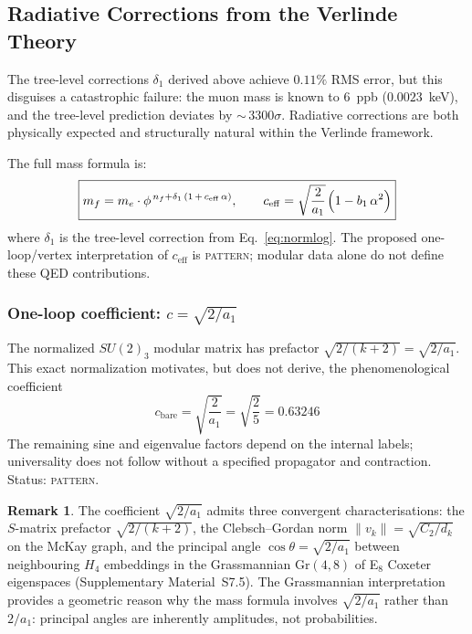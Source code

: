 \documentclass[12pt,a4paper]{article}
\theoremstyle{definition}
\newtheorem{remark}{Remark}
\begin{document}
\subsection{Radiative Corrections from the Verlinde Theory}
\label{sec:oneloop}

The tree-level corrections $\delta_1$ derived above achieve $0.11\%$ RMS error, but this disguises a catastrophic failure: the muon mass is known to $6$~ppb ($0.0023$~keV), and the tree-level prediction deviates by ${\sim}\,3300\sigma$.  Radiative corrections are both physically expected and structurally natural within the Verlinde framework.

The full mass formula is:
\begin{equation}
\boxed{m_f = m_e \cdot \phi^{\,n_f + \delta_1\,(1 \,+\, c_{\mathrm{eff}}\,\alpha)}, \qquad c_{\mathrm{eff}} = \sqrt{\frac{2}{a_1}}\;\!\Bigl(1 - b_1\,\alpha^2\Bigr)}
\label{eq:oneloop}
\end{equation}
where $\delta_1$ is the tree-level correction from Eq.~\eqref{eq:normlog}.  The proposed one-loop/vertex interpretation of \(c_{\mathrm{eff}}\) is \textsc{pattern}; modular data alone do not define these QED contributions.

\subsubsection*{One-loop coefficient: $c = \sqrt{2/a_1}$}

The normalized $SU(2)_3$ modular matrix has prefactor $\sqrt{2/(k+2)}=\sqrt{2/a_1}$.  This exact normalization motivates, but does not derive, the phenomenological coefficient
\begin{equation}
c_{\mathrm{bare}} = \sqrt{\frac{2}{a_1}} = \sqrt{\frac{2}{5}} = 0.63246
\label{eq:cqed}
\end{equation}
The remaining sine and eigenvalue factors depend on the internal labels; universality does not follow without a specified propagator and contraction.  Status: \textsc{pattern}.

\begin{remark}
The coefficient $\sqrt{2/a_1}$ admits three convergent characterisations: the $S$-matrix prefactor $\sqrt{2/(k{+}2)}$, the Clebsch--Gordan norm $\|v_k\| = \sqrt{C_2/d_k}$ on the McKay graph, and the principal angle $\cos\theta = \sqrt{2/a_1}$ between neighbouring $H_4$ embeddings in the Grassmannian $\mathrm{Gr}(4,8)$ of E$_8$ Coxeter eigenspaces (Supplementary Material~S7.5).  The Grassmannian interpretation provides a geometric reason why the mass formula involves $\sqrt{2/a_1}$ rather than $2/a_1$: principal angles are inherently amplitudes, not probabilities.
\end{remark}
\end{document}
